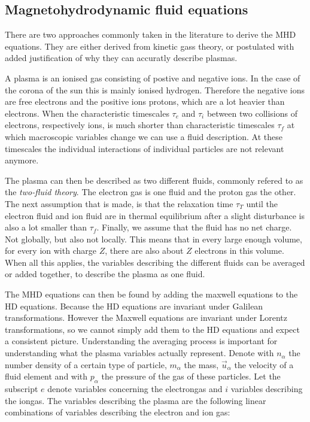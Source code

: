 \subsection{Magnetohydrodynamic fluid equations}
There are two approaches commonly taken in the literature to derive the MHD equations. They are either derived from kinetic gass theory, or postulated with added justification of why they can accuratly describe plasmas.

A plasma is an ionised gas consisting of postive and negative ions. In the case of the corona of the sun this is mainly ionised hydrogen.
Therefore the negative ions are free electrons and the positive ions protons, which are a lot heavier than electrons.
When the characteristic timescales $\tau_e$ and $\tau_i$ between two collisions of electrons, respectively ions, is much shorter than characteristic timescales $\tau_f$ at which macroscopic variables change we can use a fluid description. 
At these timescales the individual interactions of individual particles are not relevant anymore.

The plasma can then be described as two different fluids, commonly refered to as the \emph{two-fluid theory}.
The electron gas is one fluid and the proton gas the other. 
The next assumption that is made, is that the relaxation time $\tau_T$ until the electron fluid and ion fluid are in thermal equilibrium after a slight disturbance is also a lot smaller than $\tau_f$.
Finally, we assume that the fluid has no net charge. Not globally, but also not locally. 
This means that in every large enough volume, for every ion with charge $Z$, there are also about $Z$ electrons in this volume.
When all this applies, the variables describing the different fluids can be averaged or added together, to describe the plasma as one fluid.

The MHD equations can then be found by adding the maxwell equations to the HD equations. Because the HD equations are invariant under Galilean transformations. 
However the Maxwell equations are invariant under Lorentz transformations, so we cannot simply add them to the HD equations and expect a consistent picture. 
Understanding the averaging process is important for understanding what the plasma variables actually represent.
Denote with $n_\alpha$ the number density of a certain type of particle, $m_\alpha$ the mass, $\vec{u}_\alpha$ the velocity of a fluid element and with $p_\alpha$ the pressure of the gas of these particles. 
Let the subscript $e$ denote variables concerning the electrongas and $i$ variables describing the iongas.
The variables describing the plasma are the following linear combinations of variables describing the electron and ion gas:

